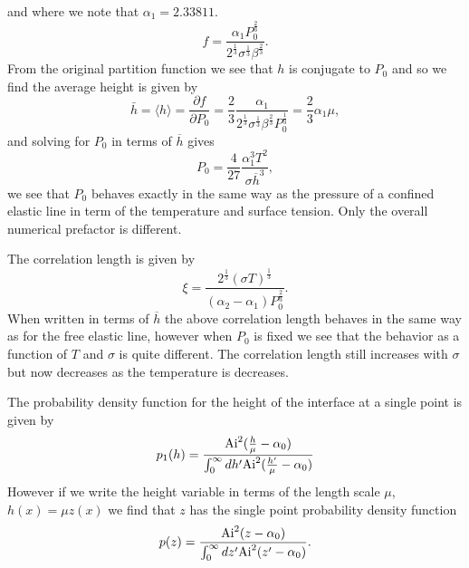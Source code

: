 and where we note that $\alpha_1 = 2.33811$.
\begin{equation}
f= \frac{\alpha_1 P_0^\frac{2}{3}}{2^\frac{1}{3} \sigma^\frac{1}{3}\beta^\frac{2}{3}}.
\end{equation}
From the original partition function we see that $h$ is conjugate to $P_0$ and so we find the average height is given by
\begin{equation}
\bar h= \langle h\rangle = \frac{\partial f}{\partial P_0} = \frac{2}{3}\frac{\alpha_1 }{2^\frac{1}{3} \sigma^\frac{1}{3}\beta^\frac{2}{3}P_0^\frac{1}{3}} = \frac{2}{3}\alpha_1\mu,\label{h1}
\end{equation}
and solving for $P_0$ in terms of $\overline h$ gives
\begin{equation}
P_0 = \frac{4}{27}\frac{\alpha_1^3 T^2}{\sigma \overline h^3},
\end{equation}
we see that $P_0$ behaves exactly in the same way as the pressure of a confined elastic line
in term of the temperature and surface tension. Only the overall numerical prefactor is different.

The correlation length is given by
\begin{equation}
\xi = \frac{2^\frac{1}{3}(\sigma T)^\frac{1}{3}}{(\alpha_2-\alpha_1)P_0^\frac{2}{3}}.
\end{equation}
When written in terms of $\overline h$ the above correlation length behaves in the same way
as for the free elastic line, however when $P_0$ is fixed we see that the behavior as a function 
of $T$ and $\sigma$ is quite different. The correlation length still increases with $\sigma$ but now decreases as the temperature is decreases.

The probability density function for the height of the interface at a single point is given
by
\begin{equation}
p_1(h) = \frac{{\rm Ai}^2(\frac{h}{\mu}-\alpha_0)}{\int_0^\infty dh' {\rm Ai}^2(\frac{h'}{\mu}-\alpha_0)}
\end{equation}
However if we write the height variable in terms of the length scale $\mu$, $h(x)= \mu z(x)$ we find that $z$ has the single point probability density function
\begin{equation}
p(z)= \frac{{\rm Ai}^2(z-\alpha_0)}{\int_0^\infty dz' {\rm Ai}^2(z'-\alpha_0)}.
\end{equation}

